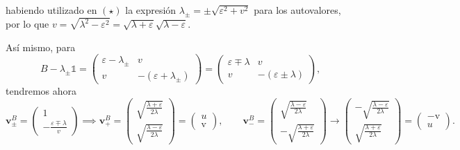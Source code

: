 \documentclass{scrartcl}
\renewcommand{\vb}[1]{\bm{#1}}
\DeclareRobustCommand{\[}{\begin{equation}}
\DeclareRobustCommand{\]}{\end{equation}}
\begin{document}
\begin{enumerate}
\begin{enumerate}
\begin{enumerate}[(i)]
{                habiendo utilizado en $(\star)$ la expresión $\lambda_\pm = \pm \sqrt{\varepsilon^2 + v^2}$ para los autovalores, por lo que $v = \sqrt{\lambda^2 - \varepsilon^2} = \sqrt{\lambda + \varepsilon} \sqrt{\lambda - \varepsilon}$.
                
                Así mismo, para
                \[ B - \lambda_{\pm} \mathds{1} = \begin{pmatrix} \varepsilon - \lambda_\pm & v \\ v & -(\varepsilon + \lambda_\pm) \end{pmatrix} = \begin{pmatrix} \varepsilon \mp \lambda & v \\ v & -(\varepsilon \pm \lambda) \end{pmatrix}, \]
                tendremos ahora
                \[ \vb{v}_\pm^B = \begin{pmatrix} 1 \\ -\frac{\varepsilon \mp \lambda}{v} \end{pmatrix} \implies \vb{v}_+^B = \begin{pmatrix} \sqrt{\frac{\lambda + \varepsilon}{2\lambda}} \\ \sqrt{\frac{\lambda - \varepsilon}{2\lambda}} \end{pmatrix} = \begin{pmatrix} u \\ \mathrm{v} \end{pmatrix}, \quad \quad \vb{v}_-^B = \begin{pmatrix} \sqrt{\frac{\lambda - \varepsilon}{2\lambda}} \\ -\sqrt{\frac{\lambda + \varepsilon}{2\lambda}} \end{pmatrix} \longrightarrow \begin{pmatrix} -\sqrt{\frac{\lambda - \varepsilon}{2\lambda}} \\ \sqrt{\frac{\lambda + \varepsilon}{2\lambda}} \end{pmatrix} = \begin{pmatrix} -\mathrm{v} \\ u \end{pmatrix}. \]
                
}
\end{enumerate}
\end{enumerate}
\end{enumerate}
\end{document}
